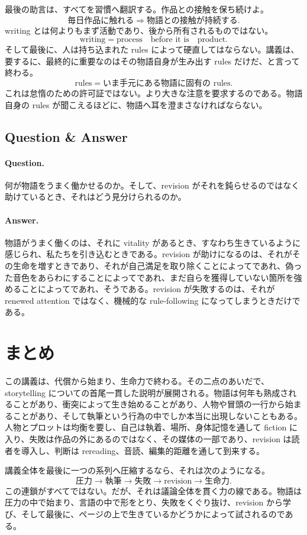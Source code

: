 最後の助言は、すべてを習慣へ翻訳する。作品との接触を保ち続けよ。
\begin{equation}
\text{毎日作品に触れる} \Rightarrow \text{物語との接触が持続する}.
\end{equation}
writing とは何よりもまず活動であり、後から所有されるものではない。
\begin{equation}
\text{writing} = \text{process} \quad \text{before it is} \quad \text{product}.
\end{equation}
そして最後に、人は持ち込まれた rules によって硬直してはならない。講義は、要するに、最終的に重要なのはその物語自身が生み出す rules だけだ、と言って終わる。
\begin{equation}
\text{rules} = \text{いま手元にある物語に固有の rules}.
\end{equation}
これは怠惰のための許可証ではない。より大きな注意を要求するのである。物語自身の rules が聞こえるほどに、物語へ耳を澄まさなければならない。

\subsection{Question \& Answer}

\paragraph{Question.} 何が物語をうまく働かせるのか。そして、revision がそれを鈍らせるのではなく助けているとき、それはどう見分けられるのか。

\paragraph{Answer.} 物語がうまく働くのは、それに vitality があるとき、すなわち生きているように感じられ、私たちを引き込むときである。revision が助けになるのは、それがその生命を増すときであり、それが自己満足を取り除くことによってであれ、偽った音色をあらわにすることによってであれ、まだ自らを獲得していない箇所を強めることによってであれ、そうである。revision が失敗するのは、それが renewed attention ではなく、機械的な rule-following になってしまうときだけである。

\section{まとめ}

この講義は、代償から始まり、生命力で終わる。その二点のあいだで、storytelling についての首尾一貫した説明が展開される。物語は何年も熟成されることがあり、衝突によって生き始めることがあり、人物や冒頭の一行から始まることがあり、そして執筆という行為の中でしか本当に出現しないこともある。人物とプロットは均衡を要し、自己は執着、場所、身体記憶を通して fiction に入り、失敗は作品の外にあるのではなく、その媒体の一部であり、revision は読者を導入し、判断は rereading、音読、編集的距離を通して到来する。

講義全体を最後に一つの系列へ圧縮するなら、それは次のようになる。
\begin{equation}
\text{圧力} \to \text{執筆} \to \text{失敗} \to \text{revision} \to \text{生命力}.
\end{equation}
この連鎖がすべてではない。だが、それは議論全体を貫く力の線である。物語は圧力の中で始まり、言語の中で形をとり、失敗をくぐり抜け、revision から学び、そして最後に、ページの上で生きているかどうかによって試されるのである。